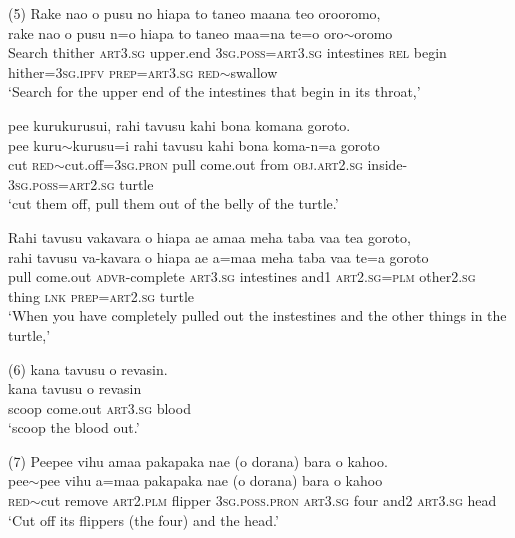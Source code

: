 \ea\label{ex:text19-42}
(5) Rake nao o pusu no hiapa to taneo maana teo orooromo,\\
\gll rake	nao	o	pusu	n=o	hiapa	to	taneo	maa=na	te=o	oro{$\sim$}oromo\\
     Search	thither	\textsc{art}3.\textsc{sg}	upper.end	3\textsc{sg}.\textsc{poss}=\textsc{art}3.\textsc{sg}	intestines	\textsc{rel}	begin	hither=3\textsc{sg}.\textsc{ipfv}	\textsc{prep}=\textsc{art}3.\textsc{sg}	\textsc{red}{$\sim$}swallow\\
\glt `Search for the upper end of the intestines that begin in its throat,'
\z

\ea\label{ex:text19-43}
pee kurukurusui, rahi tavusu kahi bona komana goroto.\\
\gll pee	kuru{$\sim$}kurusu=i	rahi	tavusu	kahi	bona	koma-n=a	goroto\\
     cut	\textsc{red}{$\sim$}cut.off=3\textsc{sg}.\textsc{pron}	pull	come.out	from	\textsc{obj}.\textsc{art}2.\textsc{sg}	inside-3\textsc{sg}.\textsc{poss}=\textsc{art}2.\textsc{sg}	turtle\\
\glt `cut them off, pull them out of the belly of the turtle.'
\z

\ea\label{ex:text19-44}
Rahi tavusu vakavara o hiapa ae amaa meha taba vaa tea goroto,\\
\gll rahi	tavusu	va-kavara	o	hiapa	ae	a=maa	meha	taba	vaa	te=a	goroto\\
     pull	come.out	\textsc{advr}-complete	\textsc{art}3.\textsc{sg}	intestines	and1	\textsc{art}2.\textsc{sg}=\textsc{plm}	other2.\textsc{sg}	thing	\textsc{lnk}	\textsc{prep}=\textsc{art}2.\textsc{sg}	turtle\\
\glt `When you have completely pulled out the instestines and the other things in the turtle,'
\z

\ea\label{ex:text19-45}
(6) kana tavusu o revasin.\\
\gll kana	tavusu	o	revasin\\
     scoop	come.out	\textsc{art}3.\textsc{sg}	blood\\
\glt `scoop the blood out.'
\z

\ea\label{ex:text19-46}
(7) Peepee vihu amaa pakapaka nae (o dorana) bara o kahoo.\\
\gll pee{$\sim$}pee	vihu	a=maa	pakapaka	nae	(o	dorana)	bara	o	kahoo\\
     \textsc{red}{$\sim$}cut	remove	\textsc{art}2.\textsc{plm}	flipper	3\textsc{sg}.\textsc{poss}.\textsc{pron}	\textsc{art}3.\textsc{sg}	four	and2	\textsc{art}3.\textsc{sg}	head\\
\glt `Cut off its flippers (the four) and the head.'
\z

